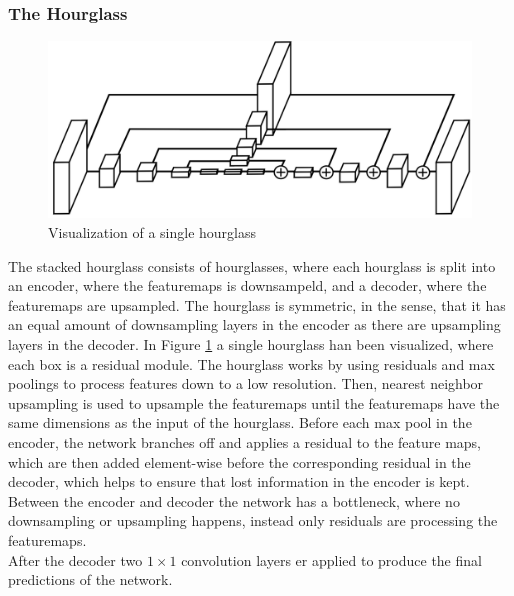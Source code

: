 \documentclass[./main.tex]{subfiles}
\begin{document}
\subsubsection{The Hourglass}
\begin{figure}[h]
    \centering
    \includegraphics[height = 4 cm]{entities/Hourglass.png}
    \caption{Visualization of a single hourglass \cite{Newell}}
    \label{fig:hourglass}
\end{figure}
\noindent The stacked hourglass consists of hourglasses, where each hourglass is split into an encoder, where the featuremaps is downsampeld, and a decoder, where the featuremaps are upsampled. The hourglass is symmetric, in the sense, that it has an equal amount of downsampling layers in the encoder as there are upsampling layers in the decoder. In Figure \ref{fig:hourglass} a single hourglass han been visualized, where each box is a residual module. The hourglass works by using residuals and max poolings to process features down to a low resolution. Then, nearest neighbor upsampling is used to upsample the featuremaps until the featuremaps have the same dimensions as the input of the hourglass. Before each max pool in the encoder, the network branches off and applies a residual to the feature maps, which are then added element-wise before the corresponding residual in the decoder, which helps to ensure that lost information in the encoder is kept.
Between the encoder and decoder the network has a bottleneck, where no downsampling or upsampling happens, instead only residuals are processing the featuremaps. \\
After the decoder two $1 \times 1$ convolution layers er applied to produce the final predictions of the network.
\end{document}
